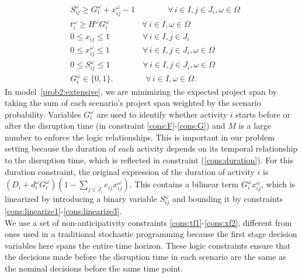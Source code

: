 \documentclass[11pt]{article}
\begin{document}
\begin{subequations}
\begin{align}
		& S_{ij}^\omega \geq G_i^\omega + x_{ij}^\omega - 1 \qquad \qquad \forall \,i \in I, j \in J_i, \omega \in \Omega \label{cons:linearize3}\\
		& t_i^\omega \geq H^\omega G_i^\omega \qquad \qquad \forall\, i \in I, \omega \in \Omega \\
		& 0 \leq x_{ij} \leq 1 \qquad \qquad \forall \,i \in I, j \in J_i\\ 
		& 0 \leq x_{ij}^\omega \leq 1 \qquad \qquad \forall \,i \in I, j \in J_i, \omega \in \Omega\\
		& 0 \leq S_{ij}^\omega \leq 1 \qquad \qquad \forall \,i \in I, j \in J_i, \omega \in \Omega\\
		& G_i^\omega \in \{0,1\}. \qquad \qquad \forall \,i \in I, \omega \in \Omega.
		\end{align}
	\end{subequations}
	In model~\eqref{prob2:extensive}, we are minimizing the expected project span by taking the sum of each scenario's project span weighted by the scenario probability. Variables \(G^\omega_i\) are used to identify whether activity \(i\) starts before or after the disruption time (in constraint \eqref{cons:F}-\eqref{cons:G}) and \(M\) is a large number to enforce the logic relationships. This is important in our problem setting because the duration of each activity depends on its temporal relationship to the disruption time, which is reflected in constraint (\ref{cons:duration}). For this duration constraint, the original expression of the duration of activity \(i\) is \((D_i + d_i^\omega G_i^\omega)(1 - \sum_{j \in J_i} e_{ij}x_{ij}^\omega)\). This contains a bilinear term \(G_i^\omega x_{ij}^\omega\), which is linearized by introducing a binary variable \(S_{ij}^\omega\) and bounding it by constraints \eqref{cons:linearize1}-\eqref{cons:linearize3}.\\
	\newline
	We use a set of non-anticipativity constraints \eqref{cons:tf1}-\eqref{cons:xf2}, different from ones used in a traditional stochastic programming because the first stage decision variables here spans the entire time horizon. These logic constraints ensure that the decisions made before the disruption time in each scenario are the same as the nominal decisions before the same time point.
	
\end{document}
